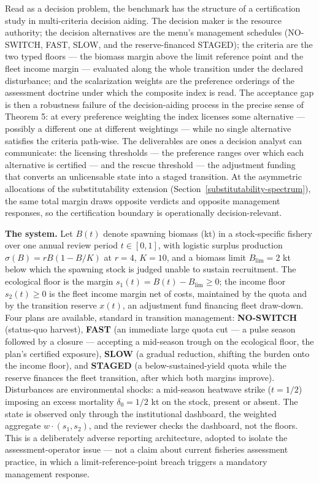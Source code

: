 \documentclass[3p,11pt]{elsarticle}
\begin{document}
Read as a decision problem, the benchmark has the structure of a
certification study in multi-criteria decision aiding. The decision
maker is the resource authority; the decision alternatives are the
menu's management schedules (NO-SWITCH, FAST, SLOW, and the
reserve-financed STAGED); the criteria are the two typed floors ---
the biomass margin above the limit reference point and the fleet
income margin --- evaluated along the whole transition under the
declared disturbance; and the scalarization weights are the preference
orderings of the assessment doctrine under which the composite index
is read. The acceptance gap is then a robustness failure of the
decision-aiding process in the precise sense of Theorem 5: at every
preference weighting the index licenses some alternative --- possibly
a different one at different weightings --- while no single
alternative satisfies the criteria path-wise. The deliverables are
ones a decision analyst can communicate: the licensing thresholds ---
the preference ranges over which each alternative is certified --- and
the rescue threshold --- the adjustment funding that converts an
unlicensable state into a staged transition. At the asymmetric
allocations of the substitutability extension
(Section~\ref{substitutability-spectrum}), the same total margin
draws opposite verdicts and opposite management responses, so the
certification boundary is operationally decision-relevant.

\textbf{The system.} Let \(B(t)\) denote spawning biomass (kt) in a
stock-specific fishery over one annual review period \(t \in [0, 1]\), with
logistic surplus production
\(\sigma(B) = r B (1 - B/K)\) at \(r = 4\), \(K = 10\), and a biomass limit
\(B_{\mathrm{lim}} = 2\) kt below which the spawning stock is judged unable
to sustain recruitment. The ecological floor is the margin
\(s_1(t) = B(t) - B_{\mathrm{lim}} \ge 0\); the income floor
\(s_2(t) \ge 0\) is the fleet income margin net of costs, maintained by the
quota and by the transition reserve \(x(t)\), an adjustment fund financing
fleet draw-down. Four plans are available, standard in transition management:
\textbf{NO-SWITCH} (status-quo harvest), \textbf{FAST} (an immediate large
quota cut --- a pulse season followed by a closure --- accepting a
mid-season trough on the ecological floor, the plan's certified
exposure), \textbf{SLOW} (a gradual reduction, shifting the burden onto
the income floor), and \textbf{STAGED} (a
below-sustained-yield quota while the reserve finances the fleet transition,
after which both margins improve). Disturbances are environmental shocks: a
mid-season heatwave strike (\(t = 1/2\)) imposing an excess mortality
\(\delta_0 = 1/2\) kt on the stock, present or absent. The state is observed
only through the institutional dashboard, the weighted aggregate
\(w \cdot (s_1, s_2)\), and the reviewer checks the dashboard, not the
floors. This is a deliberately adverse reporting architecture, adopted to
isolate the assessment-operator issue --- not a claim about current
fisheries assessment practice, in which a limit-reference-point breach
triggers a mandatory management response.
\end{document}
